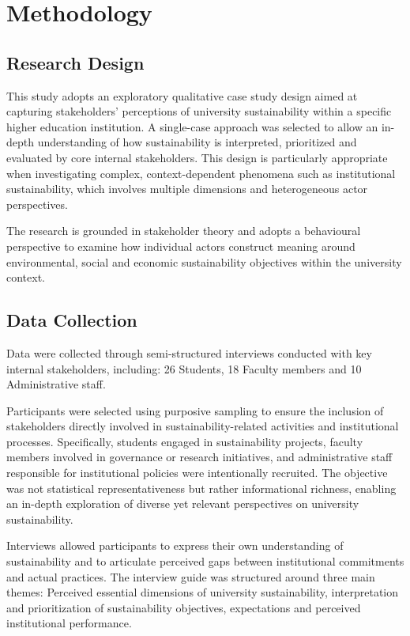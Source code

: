 \documentclass[12pt,a4paper]{article}
\begin{document}
\section{Methodology}

\subsection{Research Design}

This study adopts an exploratory qualitative case study design aimed at capturing stakeholders’ perceptions of university sustainability within a specific higher education institution. A single-case approach was selected to allow an in-depth understanding of how sustainability is interpreted, prioritized and evaluated by core internal stakeholders. This design is particularly appropriate when investigating complex, context-dependent phenomena such as institutional sustainability, which involves multiple dimensions and heterogeneous actor perspectives.

The research is grounded in stakeholder theory \citep{Freeman1984} and adopts a behavioural perspective to examine how individual actors construct meaning around environmental, social and economic sustainability objectives within the university context.

\subsection{Data Collection}

Data were collected through semi-structured interviews conducted with key internal stakeholders, including: 26 Students, 18 Faculty members and 10 Administrative staff.

Participants were selected using purposive sampling to ensure the inclusion of stakeholders directly involved in sustainability-related activities and institutional processes. Specifically, students engaged in sustainability projects, faculty members involved in governance or research initiatives, and administrative staff responsible for institutional policies were intentionally recruited. The objective was not statistical representativeness but rather informational richness, enabling an in-depth exploration of diverse yet relevant perspectives on university sustainability.

Interviews allowed participants to express their own understanding of sustainability and to articulate perceived gaps between institutional commitments and actual practices. The interview guide was structured around three main themes: Perceived essential dimensions of university sustainability, interpretation and prioritization of sustainability objectives, expectations and perceived institutional performance.
\end{document}
